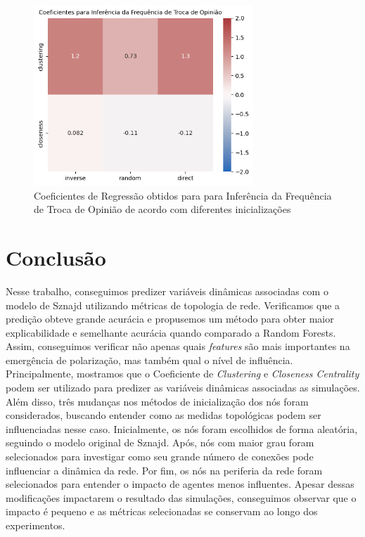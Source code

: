 \begin{figure}
\centering
\includegraphics[width=\textwidth,height=2.66667in]{frequency_heatmap.png}
\caption{Coeficientes de Regressão obtidos para para Inferência da
Frequência de Troca de Opinião de acordo com diferentes inicializações}
\end{figure}

\section{Conclusão}\label{conclusuxe3o}

Nesse trabalho, conseguimos predizer variáveis dinâmicas associadas com
o modelo de Sznajd utilizando métricas de topologia de rede. Verificamos
que a predição obteve grande acurácia e propusemos um método para obter
maior explicabilidade e semelhante acurácia quando comparado a Random
Forests. Assim, conseguimos verificar não apenas quais \emph{features}
são mais importantes na emergência de polarização, mas também qual o
nível de influência. Principalmente, mostramos que o Coeficiente de
\emph{Clustering} e \emph{Closeness Centrality} podem ser utilizado para
predizer as variáveis dinâmicas associadas as simulações. Além disso,
três mudanças nos métodos de inicialização dos nós foram considerados,
buscando entender como as medidas topológicas podem ser influenciadas
nesse caso. Inicialmente, os nós foram escolhidos de forma aleatória,
seguindo o modelo original de Sznajd. Após, nós com maior grau foram
selecionados para investigar como seu grande número de conexões pode
influenciar a dinâmica da rede. Por fim, os nós na periferia da rede
foram selecionados para entender o impacto de agentes menos influentes.
Apesar dessas modificações impactarem o resultado das simulações,
conseguimos observar que o impacto é pequeno e as métricas selecionadas
se conservam ao longo dos experimentos.


